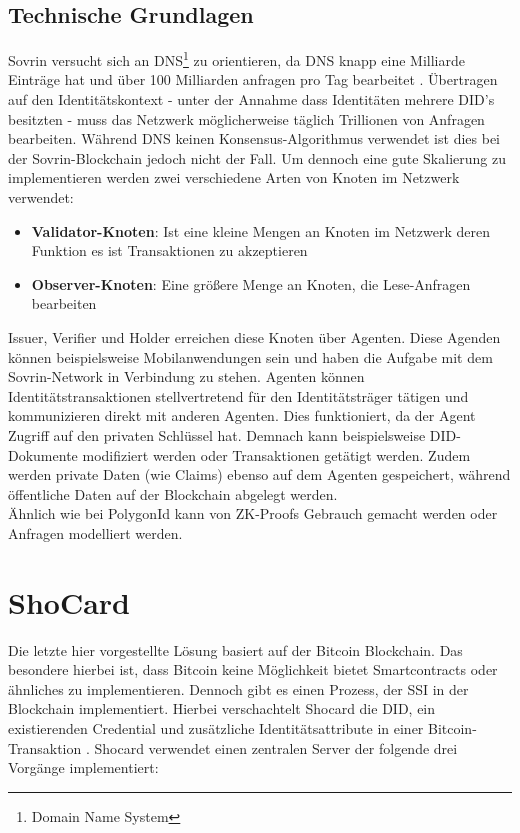 \subsection{Technische Grundlagen}
Sovrin versucht sich an DNS\footnote{Domain Name System} zu orientieren, da DNS knapp eine Milliarde Einträge hat und über 100 Milliarden anfragen pro Tag bearbeitet \cite{ID42}. Übertragen auf den Identitätskontext - unter der Annahme dass Identitäten mehrere DID's besitzten - muss das Netzwerk möglicherweise täglich Trillionen von Anfragen bearbeiten.
Während DNS keinen Konsensus-Algorithmus verwendet ist dies bei der Sovrin-Blockchain jedoch nicht der Fall. Um dennoch eine gute Skalierung zu implementieren werden zwei verschiedene Arten von Knoten im Netzwerk verwendet:
\begin{itemize}
	\item \textbf{Validator-Knoten}: Ist eine kleine Mengen an Knoten im Netzwerk deren Funktion es ist Transaktionen zu akzeptieren
	\item \textbf{Observer-Knoten}: Eine größere Menge an Knoten, die Lese-Anfragen bearbeiten
\end{itemize}
Issuer, Verifier und Holder erreichen diese Knoten über Agenten. Diese Agenden können beispielsweise Mobilanwendungen sein und haben die Aufgabe mit dem Sovrin-Network in Verbindung zu stehen. Agenten können Identitätstransaktionen stellvertretend für den Identitätsträger tätigen und kommunizieren direkt mit anderen Agenten. Dies funktioniert, da der Agent Zugriff auf den privaten Schlüssel hat. Demnach kann beispielsweise DID-Dokumente modifiziert werden oder Transaktionen getätigt werden.
Zudem werden private Daten (wie Claims) ebenso auf dem Agenten gespeichert, während öffentliche Daten auf der Blockchain abgelegt werden. \\
Ähnlich wie bei PolygonId kann von ZK-Proofs Gebrauch gemacht werden oder Anfragen modelliert werden.

\section{ShoCard}
Die letzte hier vorgestellte Lösung basiert auf der Bitcoin Blockchain. Das besondere hierbei ist, dass Bitcoin keine Möglichkeit bietet Smartcontracts oder ähnliches zu implementieren. Dennoch gibt es einen Prozess, der SSI in der Blockchain implementiert. Hierbei verschachtelt Shocard die DID, ein existierenden Credential und zusätzliche Identitätsattribute in einer Bitcoin-Transaktion \cite{ID46}. Shocard verwendet einen zentralen Server der folgende drei Vorgänge implementiert:

